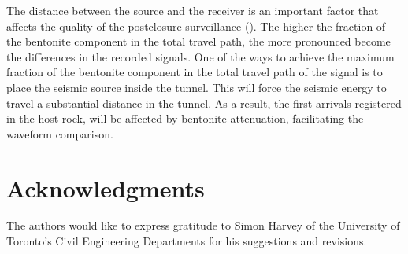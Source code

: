 \documentclass[letterpaper,11pt]{article}
\begin{document}
The distance between the source and the receiver is an important factor that affects the quality of the postclosure surveillance (\cite{marelli_appraisal_2010,manukyan_seismic_2012}). The higher the fraction of the bentonite component in the total travel path, the more pronounced become the differences in the recorded signals. One of the ways to achieve the maximum fraction of the bentonite component in the total travel path of the signal is to place the seismic source inside the tunnel. This will force the seismic energy to travel a substantial distance in the tunnel. As a result, the first arrivals registered in the host rock, will be affected by bentonite attenuation, facilitating the waveform comparison.

\section*{Acknowledgments}
The authors would like to express gratitude to Simon Harvey of the University of Toronto's Civil Engineering Departments for his suggestions and revisions. 
\newpage


\end{document}
